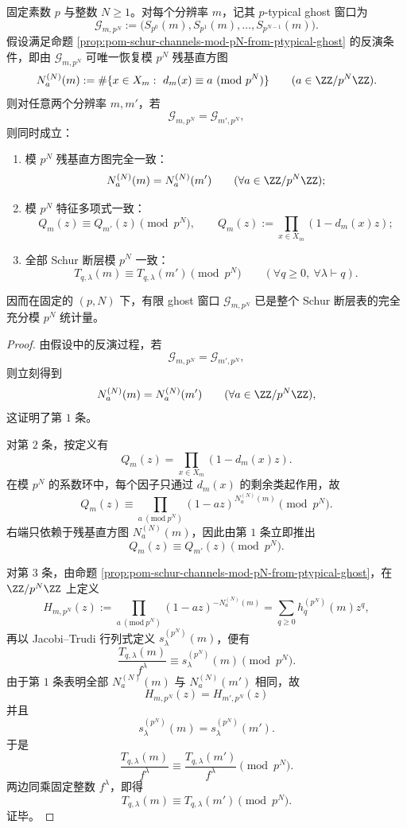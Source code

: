 \begin{theorem}\label{thm:conclusion-finite-padic-ghost-window-schur-rigidity}
固定素数 \(p\) 与整数 \(N\ge 1\)。对每个分辨率 \(m\)，记其 \(p\)-typical ghost 窗口为
\[
\mathcal G_{m,p^N}:=\bigl(S_{p^0}(m),S_{p^1}(m),\dots,S_{p^{N-1}}(m)\bigr).
\]
假设满足命题 \ref{prop:pom-schur-channels-mod-pN-from-ptypical-ghost} 的反演条件，即由 \(\mathcal G_{m,p^N}\) 可唯一恢复模 \(p^N\) 残基直方图
\[
N_a^{(N)}(m):=\#\{x\in X_m:\ d_m(x)\equiv a\ (\mathrm{mod}\ p^N)\}
\qquad(a\in\ZZ/p^N\ZZ).
\]
则对任意两个分辨率 \(m,m'\)，若
\[
\boxed{\;
\mathcal G_{m,p^N}=\mathcal G_{m',p^N},\;}
\]
则同时成立：
\begin{enumerate}
  \item 模 \(p^N\) 残基直方图完全一致：
  \[
  N_a^{(N)}(m)=N_a^{(N)}(m')
  \qquad(\forall a\in\ZZ/p^N\ZZ);
  \]
  \item 模 \(p^N\) 特征多项式一致：
  \[
  \boxed{\;
  Q_m(z)\equiv Q_{m'}(z)\pmod{p^N},\qquad
  Q_m(z):=\prod_{x\in X_m}(1-d_m(x)z);\;}
  \]
  \item 全部 Schur 断层模 \(p^N\) 一致：
  \[
  \boxed{\;
  T_{q,\lambda}(m)\equiv T_{q,\lambda}(m')\pmod{p^N}
  \qquad(\forall q\ge 0,\ \forall \lambda\vdash q).\;}
  \]
\end{enumerate}
因而在固定的 \((p,N)\) 下，有限 ghost 窗口 \(\mathcal G_{m,p^N}\) 已是整个 Schur 断层表的完全充分模 \(p^N\) 统计量。
\end{theorem}
\begin{proof}
由假设中的反演过程，若
\[
\mathcal G_{m,p^N}=\mathcal G_{m',p^N},
\]
则立刻得到
\[
N_a^{(N)}(m)=N_a^{(N)}(m')
\qquad(\forall a\in\ZZ/p^N\ZZ),
\]
这证明了第 \(1\) 条。

对第 \(2\) 条，按定义有
\[
Q_m(z)=\prod_{x\in X_m}(1-d_m(x)z).
\]
在模 \(p^N\) 的系数环中，每个因子只通过 \(d_m(x)\) 的剩余类起作用，故
\[
Q_m(z)\equiv \prod_{a\ (\mathrm{mod}\ p^N)}(1-az)^{N_a^{(N)}(m)}\pmod{p^N}.
\]
右端只依赖于残基直方图 \(N_a^{(N)}(m)\)，因此由第 \(1\) 条立即推出
\[
Q_m(z)\equiv Q_{m'}(z)\pmod{p^N}.
\]

对第 \(3\) 条，由命题 \ref{prop:pom-schur-channels-mod-pN-from-ptypical-ghost}，在 \(\ZZ/p^N\ZZ\) 上定义
\[
H_{m,p^N}(z)
:=
\prod_{a\ (\mathrm{mod}\ p^N)}(1-az)^{-N_a^{(N)}(m)}
=
\sum_{q\ge 0}h_q^{(p^N)}(m)z^q,
\]
再以 Jacobi--Trudi 行列式定义 \(s_\lambda^{(p^N)}(m)\)，便有
\[
\frac{T_{q,\lambda}(m)}{f^\lambda}
\equiv
s_\lambda^{(p^N)}(m)
\pmod{p^N}.
\]
由于第 \(1\) 条表明全部 \(N_a^{(N)}(m)\) 与 \(N_a^{(N)}(m')\) 相同，故
\[
H_{m,p^N}(z)=H_{m',p^N}(z)
\]
并且
\[
s_\lambda^{(p^N)}(m)=s_\lambda^{(p^N)}(m').
\]
于是
\[
\frac{T_{q,\lambda}(m)}{f^\lambda}
\equiv
\frac{T_{q,\lambda}(m')}{f^\lambda}
\pmod{p^N}.
\]
两边同乘固定整数 \(f^\lambda\)，即得
\[
T_{q,\lambda}(m)\equiv T_{q,\lambda}(m')\pmod{p^N}.
\]
证毕。
\end{proof}


